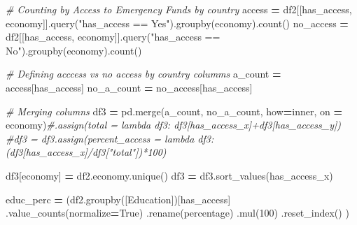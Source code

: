 \documentclass[water,article,submit,moreauthors,pdftex]{mdpi}
\newenvironment{Shaded}{\begin{snugshade}}{\end{snugshade}}
\newcommand{\CommentTok}[1]{\textcolor[rgb]{0.56,0.35,0.01}{\textit{#1}}}
\newcommand{\DecValTok}[1]{\textcolor[rgb]{0.00,0.00,0.81}{#1}}
\newcommand{\NormalTok}[1]{#1}
\newcommand{\OperatorTok}[1]{\textcolor[rgb]{0.81,0.36,0.00}{\textbf{#1}}}
\newcommand{\StringTok}[1]{\textcolor[rgb]{0.31,0.60,0.02}{#1}}
\newcommand{\VariableTok}[1]{\textcolor[rgb]{0.00,0.00,0.00}{#1}}
\begin{document}
\begin{Shaded}
\begin{Highlighting}[]
\CommentTok{\# Counting by Access to Emergency Funds by country}
\NormalTok{access }\OperatorTok{=}\NormalTok{ df2[[}\StringTok{\textquotesingle{}has\_access\textquotesingle{}}\NormalTok{, }\StringTok{\textquotesingle{}economy\textquotesingle{}}\NormalTok{]].query(}\StringTok{"has\_access == \textquotesingle{}Yes\textquotesingle{}"}\NormalTok{).groupby(}\StringTok{\textquotesingle{}economy\textquotesingle{}}\NormalTok{).count()}
\NormalTok{no\_access }\OperatorTok{=}\NormalTok{ df2[[}\StringTok{\textquotesingle{}has\_access\textquotesingle{}}\NormalTok{, }\StringTok{\textquotesingle{}economy\textquotesingle{}}\NormalTok{]].query(}\StringTok{"has\_access == \textquotesingle{}No\textquotesingle{}"}\NormalTok{).groupby(}\StringTok{\textquotesingle{}economy\textquotesingle{}}\NormalTok{).count()}
 
\CommentTok{\# Defining acccess vs no access by country columms}
\NormalTok{a\_count }\OperatorTok{=}\NormalTok{ access[}\StringTok{\textquotesingle{}has\_access\textquotesingle{}}\NormalTok{]}
\NormalTok{no\_a\_count }\OperatorTok{=}\NormalTok{ no\_access[}\StringTok{\textquotesingle{}has\_access\textquotesingle{}}\NormalTok{]}
 
\CommentTok{\# Merging columns}
\NormalTok{df3 }\OperatorTok{=}\NormalTok{ pd.merge(a\_count, no\_a\_count, how}\OperatorTok{=}\StringTok{\textquotesingle{}inner\textquotesingle{}}\NormalTok{, on }\OperatorTok{=} \StringTok{\textquotesingle{}economy\textquotesingle{}}\NormalTok{)}\CommentTok{\#.assign(total = lambda df3: df3[\textquotesingle{}has\_access\_x\textquotesingle{}]+df3[\textquotesingle{}has\_access\_y\textquotesingle{}])}
\CommentTok{\#df3 = df3.assign(percent\_access = lambda df3: (df3[\textquotesingle{}has\_access\_x\textquotesingle{}]/df3["total"])*100)}
 
\NormalTok{df3[}\StringTok{\textquotesingle{}economy\textquotesingle{}}\NormalTok{] }\OperatorTok{=}\NormalTok{ df2.economy.unique()}
\NormalTok{df3 }\OperatorTok{=}\NormalTok{ df3.sort\_values(}\StringTok{\textquotesingle{}has\_access\_x\textquotesingle{}}\NormalTok{)}


\NormalTok{educ\_perc }\OperatorTok{=}\NormalTok{ (df2.groupby([}\StringTok{\textquotesingle{}Education\textquotesingle{}}\NormalTok{])[}\StringTok{\textquotesingle{}has\_access\textquotesingle{}}\NormalTok{]}
\NormalTok{                     .value\_counts(normalize}\OperatorTok{=}\VariableTok{True}\NormalTok{)}
\NormalTok{                     .rename(}\StringTok{\textquotesingle{}percentage\textquotesingle{}}\NormalTok{)}
\NormalTok{                     .mul(}\DecValTok{100}\NormalTok{)}
\NormalTok{                     .reset\_index()}
\NormalTok{                     )}
\end{Highlighting}
\end{Shaded}
\end{document}
